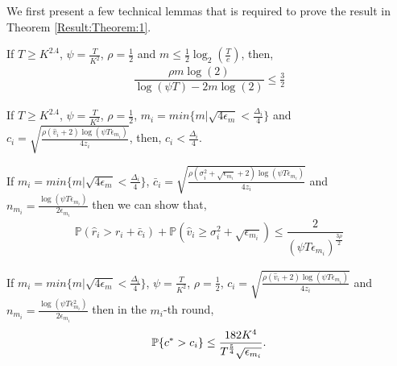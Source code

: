 We first present a few technical lemmas that is required  to prove the result in Theorem \ref{Result:Theorem:1}.

\begin{lemma}
\label{proofTheorem:Lemma:1}
If $T\geq K^{2.4}$, $\psi=\frac{T}{ K^2}$, $\rho=\frac{1}{2}$ and $m\leq \frac{1}{2} \log_2\left(\frac{T}{e}\right) $, then,
\begin{align*}
\dfrac{\rho m \log(2)}{\log(\psi T) - 2m\log( 2)} \leq \frac{3}{2}
\end{align*}
\end{lemma}



\begin{lemma}
\label{proofTheorem:Lemma:2}
If $T\geq K^{2.4}$, $\psi=\frac{T}{ K^2}$, $\rho =\frac{1}{2}$, $m_i = min\lbrace m|\sqrt{4\epsilon_{m} } < \frac{\Delta_i}{4} \rbrace $ and $c_{i} =\sqrt{\frac{\rho (\hat{v}_i + 2)\log (\psi T\epsilon_{m_{i}})}{4 z_i}}$, then, $c_{i} < \frac{\Delta_i}{4}$.
\end{lemma}



\begin{lemma}
\label{proofTheorem:Lemma:3}
If $m_i = min\lbrace m|\sqrt{4\epsilon_{m} } < \frac{\Delta_i}{4} \rbrace $,  $\bar{c}_i=\sqrt{\frac{\rho (\sigma_{i}^{2}+\sqrt{\epsilon_{m_{i}}} + 2)\log(\psi T\epsilon_{m_{i}})}{4z_i}}$ and $n_{m_i} = \frac{\log{(\psi T\epsilon_{m_{i}})}}{2\epsilon_{m_{i}}}$ then we can show that,
\begin{align*}
\mathbb{P}\left( \hat{r}_{i} > r_{i}+ \bar{c}_i\right) 
+ \mathbb{P}\left( \hat{v}_{i}\geq \sigma_{i}^{2}+\sqrt{\epsilon_{m_{i}}}\right) \leq \dfrac{2}{(\psi  T\epsilon_{m_{i}})^{\frac{3\rho}{2}}}
\end{align*}
\end{lemma}



\begin{lemma}
\label{proofTheorem:Lemma:4}
If $m_i = min\lbrace m|\sqrt{4\epsilon_{m} } < \frac{\Delta_i}{4} \rbrace $, $\psi=\frac{T}{ K^2}$, $\rho=\frac{1}{2}$, $c_{i} =\sqrt{\frac{\rho(\hat{v}_i + 2)\log (\psi T\epsilon_{m_{i}})}{4 z_{i}}}$ and $n_{m_i}=\frac{\log{(\psi T\epsilon_{m_{i}}^{2})}}{2\epsilon_{m_{i}}}$ then in the $m_i$-th round, 
\begin{align*}
\mathbb{P}\lbrace c^{*} > c_i \rbrace  \leq \dfrac{182 K^4}{T^{\frac{5}{4}}\sqrt{\epsilon_{m_i}}}.
\end{align*}
\end{lemma}



